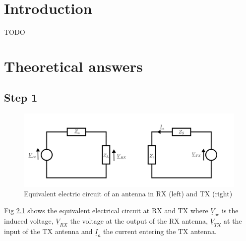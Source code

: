 \documentclass[10pt,a4paper]{ULBreport}
\begin{document}
 





\chapter{Introduction}

\begin{center}
    
    \Huge TODO
    \normalsize
    
\end{center}
\chapter{Theoretical answers}

\section{Step 1}

\begin{figure}[H]
    \centering
    \includegraphics[width=1\textwidth]{circuit.png}
    \caption{Equivalent electric circuit of an antenna in RX (left) and TX (right)}
    \label{fig:equivalent_electrical_circuit}
\end{figure}

Fig \ref{fig:equivalent_electrical_circuit} shows the equivalent electrical circuit at RX and TX where $\underline{V}_{oc}$ is the induced voltage, $\underline{V}_{RX}$ the voltage at the output of the RX antenna, $\underline{V}_{TX}$ at the input of the TX antenna and $\underline{I}_{a}$ the current entering the TX antenna.\\
\end{document}
